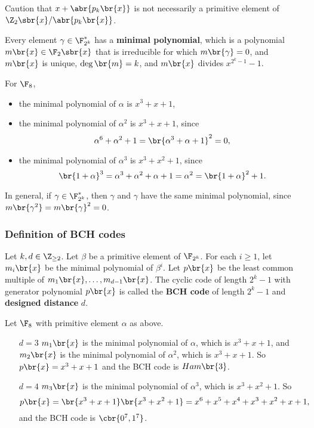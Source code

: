 Caution that $ x + \abr{p_k\br{x}} $ is not necessarily a primitive element of $ \Z_2\sbr{x} / \abr{p_k\br{x}} $.

\begin{fact*}
Every element $ \gamma \in \F_{2^k}^* $ has a \textbf{minimal polynomial}, which is a polynomial $ m\br{x} \in \F_2\sbr{x} $ that is irreducible for which $ m\br{\gamma} = 0 $, and $ m\br{x} $ is unique, $ \deg\br{m} = k $, and $ m\br{x} $ divides $ x^{2^k - 1} - 1 $.
\end{fact*}

\begin{example*}
For $ \F_8 $,
\begin{itemize}
\item the minimal polynomial of $ \alpha $ is $ x^3 + x + 1 $,
\item the minimal polynomial of $ \alpha^2 $ is $ x^3 + x + 1 $, since
$$ \alpha^6 + \alpha^2 + 1 = \br{\alpha^3 + \alpha + 1}^2 = 0, $$
\item the minimal polynomial of $ \alpha^3 $ is $ x^3 + x^2 + 1 $, since
$$ \br{1 + \alpha}^3 = \alpha^3 + \alpha^2 + \alpha + 1 = \alpha^2 = \br{1 + \alpha}^2 + 1. $$
\end{itemize}
\end{example*}

\begin{note*}
In general, if $ \gamma \in \F_{2^k}^* $, then $ \gamma $ and $ \gamma $ have the same minimal polynomial, since $ m\br{\gamma^2} = m\br{\gamma}^2 = 0 $.
\end{note*}

\pagebreak

\subsubsection{Definition of BCH codes}

Let $ k, d \in \Z_{\ge 2} $. Let $ \beta $ be a primitive element of $ \F_{2^k} $. For each $ i \ge 1 $, let $ m_i\br{x} $ be the minimal polynomial of $ \beta^i $. Let $ p\br{x} $ be the least common multiple of $ m_1\br{x}, \dots, m_{d - 1}\br{x} $. The cyclic code of length $ 2^k - 1 $ with generator polynomial $ p\br{x} $ is called the \textbf{BCH code} of length $ 2^k - 1 $ and \textbf{designed distance} $ d $.

\begin{example*}
Let $ \F_8 $ with primitive element $ \alpha $ as above.
\begin{itemize}
\item[$ d = 3 $] $ m_1\br{x} $ is the minimal polynomial of $ \alpha $, which is $ x^3 + x + 1 $, and $ m_2\br{x} $ is the minimal polynomial of $ \alpha^2 $, which is $ x^3 + x + 1 $. So $ p\br{x} = x^3 + x + 1 $ and the BCH code is $ Ham\br{3} $.
\item[$ d = 4 $] $ m_3\br{x} $ is the minimal polynomial of $ \alpha^3 $, which is $ x^3 + x^2 + 1 $. So
$$ p\br{x} = \br{x^3 + x + 1}\br{x^3 + x^2 + 1} = x^6 + x^5 + x^4 + x^3 + x^2 + x + 1, $$
and the BCH code is $ \cbr{0^7, 1^7} $.
\end{itemize}
\end{example*}

